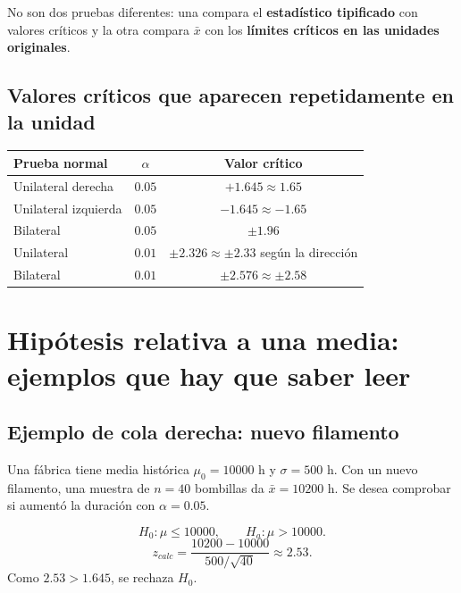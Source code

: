 \documentclass[11pt,a4paper]{article}
\begin{document}
\begin{ideaclave}
No son dos pruebas diferentes: una compara el \textbf{estadístico tipificado} con valores críticos y la otra compara $\bar{x}$ con los \textbf{límites críticos en las unidades originales}.
\end{ideaclave}

\subsection{Valores críticos que aparecen repetidamente en la unidad}

\begin{table}[H]
\centering
\begin{tabular}{lcc}
\toprule
Prueba normal & $\alpha$ & Valor crítico \\
\midrule
Unilateral derecha & $0.05$ & $+1.645\approx1.65$\\
Unilateral izquierda & $0.05$ & $-1.645\approx-1.65$\\
Bilateral & $0.05$ & $\pm1.96$\\
Unilateral & $0.01$ & $\pm2.326\approx\pm2.33$ según la dirección\\
Bilateral & $0.01$ & $\pm2.576\approx\pm2.58$\\
\bottomrule
\end{tabular}
\end{table}

\section{Hipótesis relativa a una media: ejemplos que hay que saber leer}

\subsection{Ejemplo de cola derecha: nuevo filamento}

Una fábrica tiene media histórica $\mu_0=10000$ h y $\sigma=500$ h. Con un nuevo filamento, una muestra de $n=40$ bombillas da $\bar{x}=10200$ h. Se desea comprobar si aumentó la duración con $\alpha=0.05$.

\[
H_0:\mu\le10000,
\qquad
H_a:\mu>10000.
\]
\[
z_{calc}=\frac{10200-10000}{500/\sqrt{40}}\approx2.53.
\]
Como $2.53>1.645$, se rechaza $H_0$.
\end{document}
